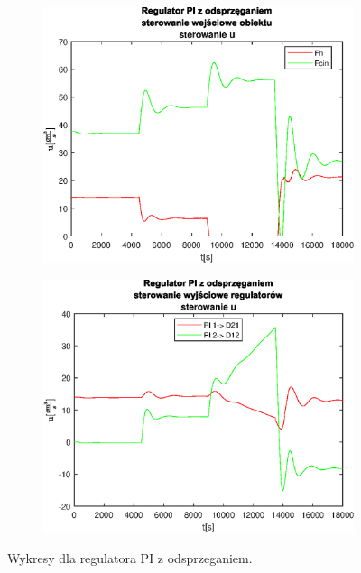 \begin{figure}[h!]
   \begin{subfigure}[b]{0.4\textwidth}
      \includegraphics[width=1\linewidth]{img/PI/decoupler/noDisturbance/PIDecouplerControl1Lintrue.eps}
      \caption{}
      \label{fig:fig:PIDecoupler1Lintrue3}
   \end{subfigure}
    
   \begin{subfigure}[b]{0.4\textwidth}
      \includegraphics[width=1\linewidth]{img/PI/decoupler/noDisturbance/PIDecouplerControlD1Lintrue.eps}
      \caption{}
      \label{fig:fig:PIDecoupler1Lintrue4}
   \end{subfigure}
       
   \caption{Wykresy dla regulatora PI z odsprzeganiem.}
   \label{fig:PIDecoupler1Lintrue}
\end{figure}
           

